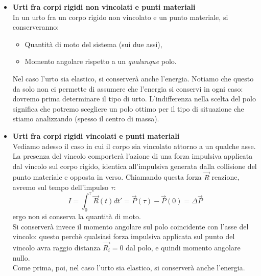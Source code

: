 \documentclass[a4paper,12pt]{article}
\begin{document}
\begin{itemize}
  \item \textbf{Urti fra corpi rigidi non vincolati e punti materiali} \\
    In un urto fra un corpo rigido non vincolato e un punto materiale, si conserveranno:
    \begin{itemize}
      \item Quantità di moto del sistema (sui due assi),
      \item Momento angolare rispetto a un \textit{qualunque} polo.
    \end{itemize}
    Nel caso l'urto sia elastico, si conserverà anche l'energia. Notiamo che questo da solo non ci permette
    di assumere che l'energia si conservi in ogni caso: dovremo prima determinare il tipo di urto.
    L'indifferenza nella scelta del polo significa che potremo scegliere un polo ottimo per il tipo di situazione
    che stiamo analizzando (spesso il centro di massa).
  \item \textbf{Urti fra corpi rigidi vincolati e punti materiali} \\
    Vediamo adesso il caso in cui il corpo sia vincolato attorno a un qualche asse. La presenza del vincolo
    comporterà l'azione di una forza impulsiva applicata dal vincolo sul corpo rigido, identica all'impulsiva generata dalla collisione del punto
    materiale e opposta in verso. Chiamando questa forza $\vec{R}$ reazione, avremo sul tempo dell'impulso $\tau$:
    $$ I = \int_0^\tau \vec{R}(t)dt' = \vec{P}(\tau) - \vec{P}(0) = \Delta \vec{P} $$
    ergo non si conserva la quantità di moto. \\
    Si conserverà invece il momento angolare sul polo coincidente con l'asse del vincolo: questo perchè qualsiasi forza impulsiva applicata sul punto del 
    vincolo avra raggio distanza $\vec{R_i} = 0$ dal polo, e quindi momento angolare nullo. \\
    Come prima, poi, nel caso l'urto sia elastico, si conserverà anche l'energia.
\end{itemize}
\end{document}
